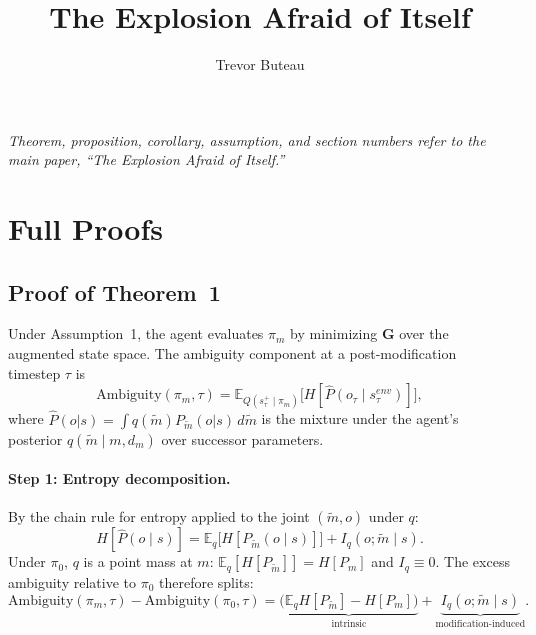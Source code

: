 \documentclass[runningheads]{llncs}
\title{The Explosion Afraid of Itself}
\author{Trevor Buteau\inst{1}}
\institute{Independent Researcher, Plaistow, NH United States
\email{trevor@globalaialignmentproject.org}}
\begin{document}
\appendix
\noindent\emph{Theorem, proposition, corollary, assumption, and section numbers refer to the main paper, ``The Explosion Afraid of Itself.''}

\section{Full Proofs}
\label{app:proofs}

\subsection{Proof of Theorem~1}

Under Assumption~1, the agent evaluates $\pi_m$ by minimizing $\mathbf{G}$ over the augmented state space. The ambiguity component at a post-modification timestep $\tau$ is
\begin{equation}
\mathrm{Ambiguity}(\pi_m, \tau) = \mathbb{E}_{Q(s^+_\tau \mid \pi_m)}\bigl[H[\hat{P}(o_\tau \mid s^{env}_\tau)]\bigr],
\end{equation}
where $\hat{P}(o|s) = \int q(\tilde{m}) P_{\tilde{m}}(o|s) \, d\tilde{m}$ is the mixture under the agent's posterior $q(\tilde{m} \mid m, d_m)$ over successor parameters.

\paragraph{Step 1: Entropy decomposition.}
By the chain rule for entropy applied to the joint $(\tilde{m}, o)$ under $q$:
\begin{equation}
H[\hat{P}(o \mid s)] = \mathbb{E}_q\bigl[H[P_{\tilde{m}}(o \mid s)]\bigr] + I_q(o; \tilde{m} \mid s).
\end{equation}
Under $\pi_0$, $q$ is a point mass at $m$: $\mathbb{E}_q[H[P_{\tilde{m}}]] = H[P_m]$ and $I_q \equiv 0$. The excess ambiguity relative to $\pi_0$ therefore splits:
\begin{equation}
\mathrm{Ambiguity}(\pi_m, \tau) - \mathrm{Ambiguity}(\pi_0, \tau) = \underbrace{\bigl(\mathbb{E}_q H[P_{\tilde{m}}] - H[P_m]\bigr)}_{\text{intrinsic}} + \underbrace{I_q(o; \tilde{m} \mid s)}_{\text{modification-induced}}.
\end{equation}
\end{document}
